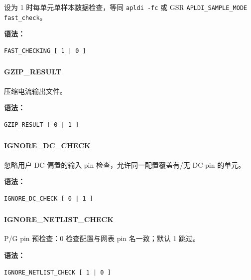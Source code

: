 设为 1 时每单元单样本数据检查，等同 \texttt{apldi -fc} 或 GSR \texttt{APLDI\_SAMPLE\_MODE fast\_check}。

\textbf{语法：}
\begin{lstlisting}
FAST_CHECKING [ 1 | 0 ]
\end{lstlisting}

\subsubsection{}
\paragraph*{GZIP_RESULT}

压缩电流输出文件。

\textbf{语法：}
\begin{lstlisting}
GZIP_RESULT [ 0 | 1 ]
\end{lstlisting}

\subsubsection{}
\paragraph*{IGNORE_DC_CHECK}

忽略用户 DC 偏置的输入 pin 检查，允许同一配置覆盖有/无 DC pin 的单元。

\textbf{语法：}
\begin{lstlisting}
IGNORE_DC_CHECK [ 0 | 1 ]
\end{lstlisting}

\subsubsection{}
\paragraph*{IGNORE_NETLIST_CHECK}

P/G pin 预检查：0 检查配置与网表 pin 名一致；默认 1 跳过。

\textbf{语法：}
\begin{lstlisting}
IGNORE_NETLIST_CHECK [ 1 | 0 ]
\end{lstlisting}

\subsubsection{}
